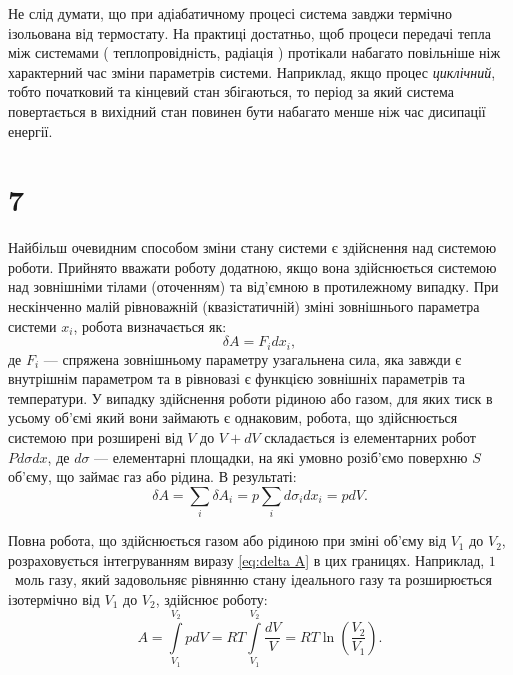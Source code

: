 Не слід думати, що при адіабатичному процесі система завджи термічно ізольована від термостату. На практиці достатньо, щоб процеси передачі тепла між системами ( теплопровідність, радіація ) протікали набагато повільніше ніж характерний час зміни параметрів системи. Наприклад, якщо процес \emph{циклічний}, тобто початковий та кінцевий стан збігаються, то період за який система повертається в вихідний стан повинен бути набагато менше ніж час дисипації енергії.




\section{7}




Найбільш очевидним способом зміни стану системи є здійснення над системою роботи. Прийнято вважати роботу додатною, якщо вона здійснюється системою над зовнішніми тілами (оточенням) та від’ємною в протилежному випадку. При нескінченно малій рівноважній (квазістатичній) зміні зовнішнього параметра системи $x_i$, робота визначається як:
\begin{equation*}
    \delta A = F_i dx_i,
\end{equation*}
де $F_i$ --- спряжена зовнішньому параметру узагальнена сила, яка завжди є внутрішнім параметром та в рівновазі є функцією зовнішніх параметрів та температури. У випадку здійснення роботи рідиною або газом, для яких тиск в усьому об'ємі який вони займають є однаковим, робота, що здійснюється системою при розширені від $V$ до $V+dV$ складається із елементарних робот $Pd\sigma dx$, де $d\sigma$ --- елементарні площадки, на які умовно розіб'ємо поверхню $S$ об’єму, що займає газ або рідина. В результаті:
\begin{equation}\label{eq:delta A}
    \delta A = \sum\limits_i\delta A_i = p \sum\limits_i d\sigma_i dx_i = p dV.
\end{equation}


Повна робота, що здійснюється газом або рідиною при зміні об’єму від $V_1$ до $V_2$, розраховується інтегруванням виразу \eqref{eq:delta A} в цих границях. Наприклад, $1$~моль газу, який задовольняє рівнянню стану ідеального газу та розширюється ізотермічно від $V_1$ до $V_2$, здійснює роботу:
\begin{equation*}\label{eq:2a}\tag{2а}
    A = \int\limits_{V_1}^{V_2} p dV = RT  \int\limits_{V_1}^{V_2} \frac{dV}{V} = RT \ln\left(\frac{V_2}{V_1}\right).
\end{equation*}

